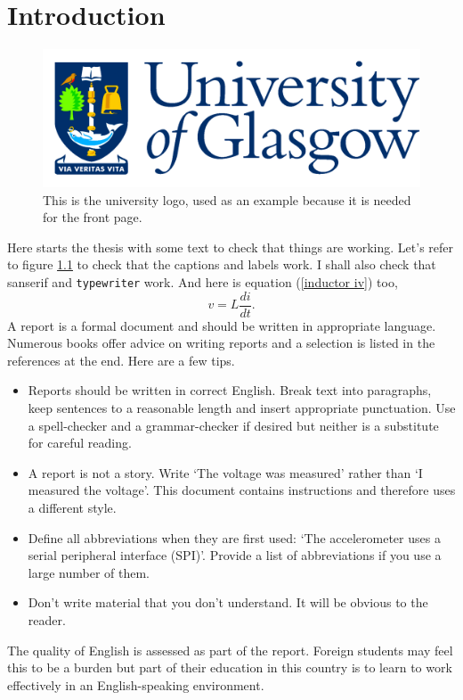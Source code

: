 \chapter{Introduction}

\begin{figure}
\centering
\includegraphics[scale=0.125]{GlaLogo.pdf}
\caption{This is the university logo, used as an example because it is needed for the front page.}
\label{logo figure}
\end{figure}

Here starts the thesis with some text to check that things are working. Let's refer to figure \ref{logo figure} to check that the captions and labels work. I shall also check that \textsf{sanserif} and \texttt{typewriter} work. And here is equation (\ref{inductor iv}) too,
\begin{equation}
v = L \frac{di}{dt} .
\label{inductor iv}
\end{equation}
A report is a formal document and should be written in appropriate language. Numerous books offer advice on writing reports and a selection is listed in the references at the end. Here are a few tips.
\begin{itemize}
\item
Reports should be written in correct English. Break text into paragraphs, keep sentences to a reasonable length and insert appropriate punctuation. Use a spell-checker and a grammar-checker if desired but neither is a substitute for careful reading.
\item
A report is not a story.
Write `The voltage was measured' rather than `I measured the voltage'. This document contains instructions and therefore uses a different style.
\item
Define all abbreviations when they are first used: `The accelerometer uses a serial peripheral interface (SPI)'. Provide a list of abbreviations if you use a large number of them.
\item
Don't write material that you don't understand. It will be obvious to the reader.
\end{itemize}
The quality of English is assessed as part of the report. Foreign students may feel this to be a burden but part of their education in this country is to learn to work effectively in an English-speaking environment. \cite{Geddes1982}


